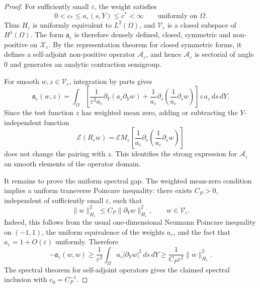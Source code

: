 \documentclass[11pt]{article}
\theoremstyle{definition}
\theoremstyle{remark}
\numberwithin{equation}{section}
\newcommand{\mc}[1]{\mathcal{#1}}
\begin{document}
\begin{proof}
For sufficiently small \(\varepsilon\), the weight satisfies
\[
0<c_*\le a_\varepsilon(s,Y)\le c^*<\infty
\qquad\text{uniformly on }\Omega.
\]
Thus \(H_\varepsilon\) is uniformly equivalent to \(L^2(\Omega)\), and
\(\mc V_\varepsilon\) is a closed subspace of \(H^1(\Omega)\). The form
\(\mathfrak a_\varepsilon\) is therefore densely defined, closed, symmetric
and non-positive on \(\mathcal X_\varepsilon\). By the representation theorem
for closed symmetric forms, it defines a self-adjoint non-positive operator
\(\mathcal A_\varepsilon\), and hence \(\mathcal A_\varepsilon\) is sectorial
of angle \(0\) and generates an analytic contraction semigroup.

For smooth \(w,z\in \mc V_\varepsilon\), integration by parts gives
\[
\mathfrak a_\varepsilon(w,z)
=
\int_\Omega
\left[
\frac{1}{\varepsilon^2a_\varepsilon}
\partial_Y(a_\varepsilon\partial_Yw)
+
\frac{1}{a_\varepsilon}
\partial_s\!\left(\frac{1}{a_\varepsilon}\partial_sw\right)
\right]
z\,a_\varepsilon\,ds\,dY.
\]
Since the test function \(z\) has weighted mean zero, adding or subtracting
the \(Y\)-independent function
\[
\mathcal E(R_\varepsilon w)
=
\mathcal E M_\varepsilon
\left[
\frac{1}{a_\varepsilon}
\partial_s\!\left(\frac{1}{a_\varepsilon}\partial_sw\right)
\right]
\]
does not change the pairing with \(z\). This identifies the strong expression
for \(\mathcal A_\varepsilon\) on smooth elements of the operator domain.

It remains to prove the uniform spectral gap. The weighted mean-zero
condition implies a uniform transverse Poincare inequality: there exists
\(C_P>0\), independent of sufficiently small \(\varepsilon\), such that
\[
\|w\|_{H_\varepsilon}^2
\le
C_P\|\partial_Yw\|_{H_\varepsilon}^2,
\qquad
w\in \mc V_\varepsilon.
\]
Indeed, this follows from the usual one-dimensional Neumann Poincare
inequality on \((-1,1)\), the uniform equivalence of the weights
\(a_\varepsilon\), and the fact that \(a_\varepsilon=1+O(\varepsilon)\)
uniformly. Therefore
\[
-\mathfrak a_\varepsilon(w,w)
\ge
\frac{1}{\varepsilon^2}
\int_\Omega a_\varepsilon|\partial_Yw|^2\,ds\,dY
\ge
\frac{1}{C_P\varepsilon^2}
\|w\|_{H_\varepsilon}^2.
\]
The spectral theorem for self-adjoint operators gives the claimed spectral
inclusion with \(c_0=C_P^{-1}\).
\end{proof}
\end{document}
